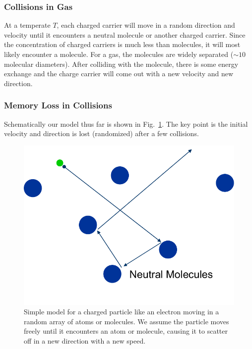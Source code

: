 \subsubsection{Collisions in Gas}
At a temperate $T$, each charged carrier will move in a random direction and velocity until it encounters a neutral molecule or another charged carrier.  Since the concentration of charged carriers is much less than molecules, it will most likely encounter a molecule. For a gas, the molecules are widely separated ($\sim 10$ molecular diameters).  After colliding with the molecule, there is some energy exchange and the charge carrier will come out with a new velocity and new direction.
\subsubsection{Memory Loss in Collisions}
 Schematically our model thus far is shown in Fig.~\ref{fig:slide8}.   The key point is the initial velocity and direction is lost (randomized) after a few collisions.
\begin{figure}
\centering
\includegraphics[width=.4\columnwidth]{slide8}
\caption{Simple model for a charged particle like an electron moving in a random array of atoms or molecules.  We assume the particle moves freely until it encounters an atom or molecule, causing it to scatter off in a new direction with a new speed.}
\label{fig:slide8}
\end{figure}
